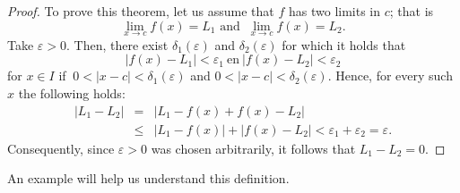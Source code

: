 \begin{proof}
To prove this theorem, let us assume that $f$ has two limits in $c$; that is
$$
\lim_{x \rightarrow c} f(x) = L_1\text{ and } ~\lim_{x \rightarrow c} f(x) = L_2.
$$
Take $\varepsilon > 0$. Then, there exist $\delta_{1}(\varepsilon)$ and  $\delta_{2}(\varepsilon)$ for which it holds that
$$
\left|f(x)-L_1\right| < \varepsilon_1 \ \mbox{en} \ \left|f(x)-L_2\right| < \varepsilon_2
$$
for $x \in I$ if $ ~0 < \left|x-c\right| < \delta_1(\varepsilon)$ and  $0 < \left|x-c\right| < \delta_2(\varepsilon)$. Hence, for every such $x$ the following holds:
\begin{eqnarray*}
\left|L_1-L_2\right| & = & \left|L_1-f(x) + f(x)-L_2\right| \\
                     & \leq & \left|L_1-f(x)\right| + \left|f(x)-L_2\right| < \varepsilon_1+\varepsilon_2=\varepsilon.   
\end{eqnarray*}
Consequently, since $\varepsilon > 0$ was chosen arbitrarily, it follows that $L_1-L_2 = 0$.
\end{proof}


\fi
\fi
 
\ifanalysis
	\ifcourse
		\checkoddpage
{}
 \fi
 


An example will help us understand this definition.

